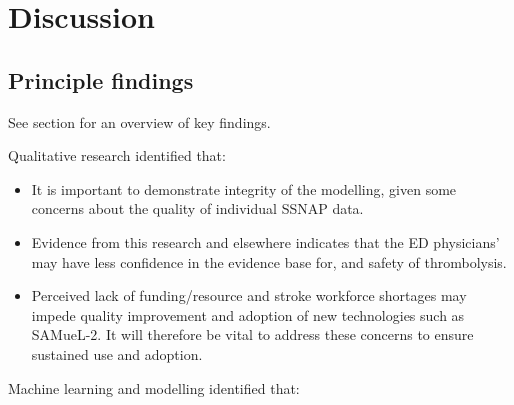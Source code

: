\section{Discussion}

\subsection{Principle findings}

See section{\label{sec:papers}} for an overview of key findings.

Qualitative research identified that:

\begin{itemize}
    \item It is important to demonstrate integrity of the modelling, given some concerns about the quality of individual SSNAP data.

    \item Evidence from this research and elsewhere indicates that the ED physicians’ may have less confidence in the evidence base for, and safety of thrombolysis.

    \item Perceived lack of funding/resource and stroke workforce shortages may impede quality improvement and adoption of new technologies such as SAMueL-2. It will therefore be vital to address these concerns to ensure sustained use and adoption.

\end{itemize}

Machine learning and modelling identified that:

